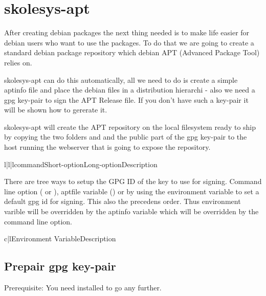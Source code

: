 \section{skolesys-apt\label{skolesys-apt}}
After creating debian packages the next thing needed is to make life easier for debian users who want to use the packages. To do that we are going to create a standard debian package repository which debian APT (Advanced Package Tool) relies on. 

skolesys-apt can do this automatically, all we need to do is create a simple aptinfo file and place the debian files in a distribution hierarchi - also we need a gpg key-pair to sign the APT Release file. If you don't have such a key-pair it will be shown how to gererate it.

skolesys-apt will create the APT repository on the local filesystem ready to ship by copying the two folders  and  and the public part of the gpg key-pair to the host running the webserver that is going to expose the repository.


\begin{tableiii}{l|l|l}{command}{Short-option}{Long-option}{Description}
\end{tableiii}

There are tree ways to setup the GPG ID of the key to use for signing. Command line option ( or ), aptfile variable () or by using the environment variable  to set a default gpg id for signing. This also the precedens order. Thus environment varible will be overridden by the aptinfo variable which will be overridden by the command line option.

\begin{tableii}{c|l}{}{Environment Variable}{Description}
\end{tableii}

\subsection{Prepair gpg key-pair\label{skolesys-apt-gpg}}

Prerequisite: You need  installed to go any further.

